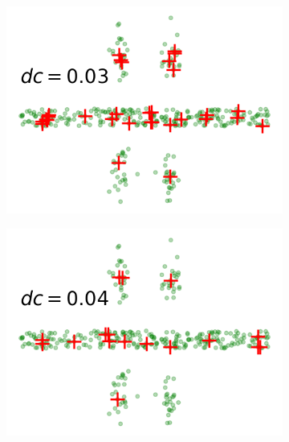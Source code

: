 \documentclass{llncs}
\begin{document}
\begin{figure}[ht]
\vspace*{-.4cm}
\centering
\begin{subfigure}[t]{0.24\textwidth}
\centering
\includegraphics[width=1\textwidth]{image/003non.png}
\end{subfigure}
\begin{subfigure}[t]{0.24\textwidth}
\centering
\includegraphics[width=1\textwidth]{image/004non.png}
\end{subfigure}
\begin{subfigure}[t]{0.24\textwidth}
\centering

\end{subfigure}
\end{figure}
\end{document}
